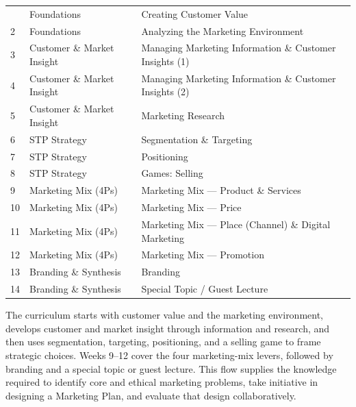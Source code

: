 \begin{tabularx}{\textwidth}{M{1.8cm}YY}&Foundations&Creating Customer Value\\
2&Foundations&Analyzing the Marketing Environment\\
3&Customer \& Market Insight&Managing Marketing Information \& Customer Insights (1)\\
4&Customer \& Market Insight&Managing Marketing Information \& Customer Insights (2)\\
5&Customer \& Market Insight&Marketing Research\\
6&STP Strategy&Segmentation \& Targeting\\
7&STP Strategy&Positioning\\
8&STP Strategy&Games: Selling\\
9&Marketing Mix (4Ps)&Marketing Mix --- Product \& Services\\
10&Marketing Mix (4Ps)&Marketing Mix --- Price\\
11&Marketing Mix (4Ps)&Marketing Mix --- Place (Channel) \& Digital Marketing\\
12&Marketing Mix (4Ps)&Marketing Mix --- Promotion\\
13&Branding \& Synthesis&Branding\\
14&Branding \& Synthesis&Special Topic / Guest Lecture\\
\end{tabularx}
\begin{visualexplanation}
The curriculum starts with customer value and the marketing environment, develops customer and market insight through information and research, and then uses segmentation, targeting, positioning, and a selling game to frame strategic choices. Weeks 9--12 cover the four marketing-mix levers, followed by branding and a special topic or guest lecture. This flow supplies the knowledge required to identify core and ethical marketing problems, take initiative in designing a Marketing Plan, and evaluate that design collaboratively.
\end{visualexplanation}

